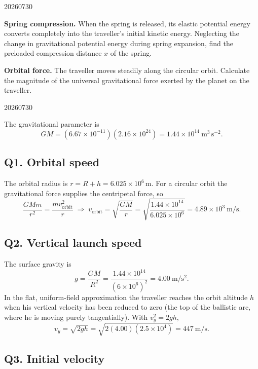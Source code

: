 \begin{problem}{20260730}
\begin{questions}
  \item \textbf{Spring compression.}
        When the spring is released, its elastic potential energy converts completely into the traveller's initial kinetic energy.  Neglecting the change in gravitational potential energy during spring expansion, find the preloaded compression distance $x$ of the spring.

  \item \textbf{Orbital force.}
        The traveller moves steadily along the circular orbit.  Calculate the magnitude of the universal gravitational force exerted by the planet on the traveller.
\end{questions}

\end{problem}

\begin{solution}{20260730}

The gravitational parameter is
\[
  GM = (6.67\times10^{-11})(2.16\times10^{24}) = 1.44\times10^{14}\ \mathrm{m^{3}\,s^{-2}}.
\]

\subsection*{Q1. Orbital speed}

The orbital radius is $r = R + h = 6.025\times10^{6}\,\mathrm{m}$.  For a circular orbit the gravitational force supplies the centripetal force, so
\[
  \frac{G M m}{r^{2}} = \frac{m v_{\text{orbit}}^{2}}{r}
  \;\Longrightarrow\;
  v_{\text{orbit}} = \sqrt{\frac{GM}{r}}
  = \sqrt{\frac{1.44\times10^{14}}{6.025\times10^{6}}}
  = \boxed{4.89\times10^{3}\ \mathrm{m/s}}.
\]

\subsection*{Q2. Vertical launch speed}

The surface gravity is
\[
  g = \frac{GM}{R^{2}} = \frac{1.44\times10^{14}}{(6\times10^{6})^{2}}
    = 4.00\ \mathrm{m/s^{2}}.
\]
In the flat, uniform-field approximation the traveller reaches the orbit altitude $h$ when his vertical velocity has been reduced to zero (the top of the ballistic arc, where he is moving purely tangentially).  With $v_{y}^{2} = 2gh$,
\[
  \boxed{v_{y} = \sqrt{2gh} = \sqrt{2(4.00)(2.5\times10^{4})}
         = 447\ \mathrm{m/s}}.
\]

\subsection*{Q3. Initial velocity}


\end{solution}
